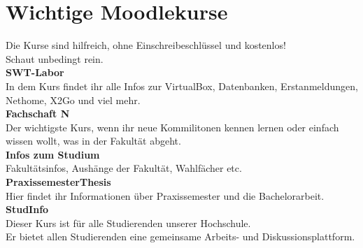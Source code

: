 \chapter{Wichtige Moodlekurse}

Die Kurse sind hilfreich, ohne Einschreibeschlüssel und kostenlos!\\
Schaut unbedingt rein.\\

\textbf{SWT-Labor}\\
In dem Kurs findet ihr alle Infos zur VirtualBox, Datenbanken, Erstanmeldungen, Nethome, X2Go und viel mehr.\\

\textbf{Fachschaft N}\\
Der wichtigste Kurs, wenn ihr neue Kommilitonen kennen lernen oder einfach wissen wollt, was in der Fakultät abgeht.\\

\textbf{Infos zum Studium}\\
Fakultätsinfos, Aushänge der Fakultät, Wahlfächer etc.\\ %

\textbf{PraxissemesterThesis}\\
Hier findet ihr Informationen über Praxissemester und die Bachelorarbeit.\\

\textbf{StudInfo}\\
Dieser Kurs ist für alle Studierenden unserer Hochschule.\\
Er bietet allen Studierenden eine gemeinsame Arbeits- und Diskussionsplattform.\\
